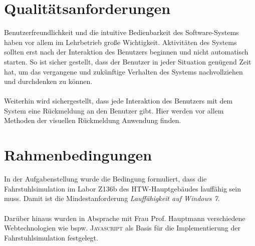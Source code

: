 \section{Qualitätsanforderungen}
Benutzerfreundlichkeit und die intuitive Bedienbarkeit des Software-Systems haben vor allem im Lehrbetrieb große Wichtigkeit. Aktivitäten des Systems sollten erst nach der Interaktion des Benutzers beginnen und nicht automatisch starten. So ist sicher gestellt, dass der Benutzer in jeder Situation genügend Zeit hat, um das vergangene und zukünftige Verhalten des Systems nachvollziehen und durchdenken zu können. 

\paragraph{}
Weiterhin wird sichergestellt, dass jede Interaktion des Benutzers mit dem System eine Rückmeldung an den Benutzer gibt. Hier werden vor allem Methoden der visuellen Rückmeldung Anwendung finden.

\section{Rahmenbedingungen}
In der Aufgabenstellung wurde die Bedingung formuliert, dass die \gls{Fahrstuhlsimulation} im Labor Z136b des HTW-Hauptgebäudes lauffähig sein muss. Damit ist die Mindestanforderung \textit{Lauffähigkeit auf Windows 7}. 

\paragraph{}
Darüber hinaus wurden in Absprache mit Frau Prof. Hauptmann verschiedene Webtechnologien wie bspw. \textsc{Javascript} als Basis für die Implementierung der \gls{Fahrstuhlsimulation} festgelegt. 

